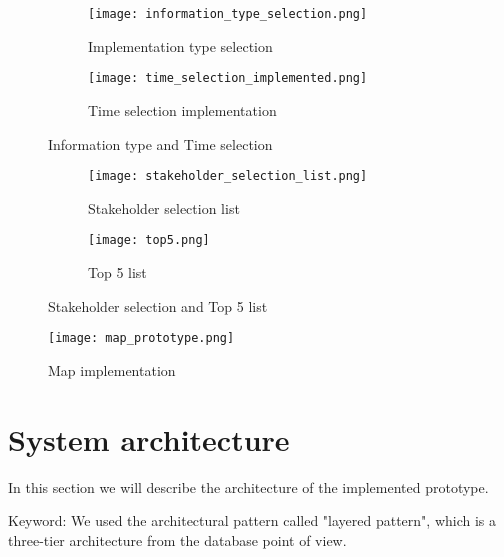 \begin{figure}[h!tbp]
	\centering
	\begin{subfigure}{0.3\textwidth}
		\texttt{[image: information\_type\_selection.png]}
		\caption[Implementation type selection]{Implementation type selection}
		\label{fig:implementation_type_selection}
	\end{subfigure}
	\begin{subfigure}{0.6\textwidth}
		\texttt{[image: time\_selection\_implemented.png]}
		\caption[Time selection implementation]{Time selection implementation}
		\label{fig:time_selection_implemented}
	\end{subfigure}
	\caption[Information type and Time selection]{Information type and Time selection}
	\label{fig:information_type_and_time_selection}
\end{figure}

\begin{figure}[h!tbp]
	\centering
	\begin{subfigure}{0.4\textwidth}
		\texttt{[image: stakeholder\_selection\_list.png]}
		\caption[Stakeholder selection list]{Stakeholder selection list}
		\label{fig:stakeholder_selection_list}
	\end{subfigure}
	\begin{subfigure}{0.4\textwidth}
		\texttt{[image: top5.png]}
		\caption[Top 5 list]{Top 5 list}
		\label{fig:top_5_list}
	\end{subfigure}
	\caption[Stakeholder selection and Top 5 list]{Stakeholder selection and Top 5 list}
	\label{fig:stakeholder_selection_and_Top5_list}
\end{figure}

\begin{figure}[!htbp]
	\texttt{[image: map\_prototype.png]}
	\caption[Map implementation]{Map implementation}
	\label{fig:map_prototype}
\end{figure}


\section{System architecture} %
\label{sec:system_architecture}
In this section we will describe the architecture of the implemented prototype.

Keyword:
We used the architectural pattern called "layered pattern"\cite[pp. 205-210]{Bass:2012:SAP:2392670}, which is a three-tier architecture from the database 
point of view\cite[pp. 294-297]{toftHanseMallaugDatabaser}.

